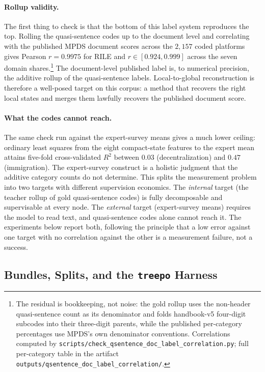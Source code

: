 \paragraph{Rollup validity.} The first thing to check is that the
bottom of this label system reproduces the top. Rolling the
quasi-sentence codes up to the document level and correlating with the
published MPDS document scores across the $2{,}157$ coded platforms
gives Pearson $r = 0.9975$ for RILE and $r \in [0.924, 0.999]$ across
the seven domain shares.\footnote{The residual is bookkeeping, not
noise: the gold rollup uses the non-header quasi-sentence count as its
denominator and folds handbook-v5 four-digit subcodes into their
three-digit parents, while the published per-category percentages use
MPDS's own denominator conventions. Correlations computed by
\texttt{scripts/check\_qsentence\_doc\_label\_correlation.py}; full
per-category table in the artifact
\texttt{outputs/qsentence\_doc\_label\_correlation/}.} The
document-level published label is, to numerical precision, the additive
rollup of the quasi-sentence labels. Local-to-global reconstruction is
therefore a well-posed target on this corpus: a method that recovers
the right local states and merges them lawfully recovers the published
document score.

\paragraph{What the codes cannot reach.} The same check run against
the \citet{BenoitEtAl2025} expert-survey means gives a much lower
ceiling: ordinary least squares from the eight compact-state features
to the expert mean attains five-fold cross-validated $R^2$ between
$0.03$ (decentralization) and $0.47$ (immigration). The expert-survey
construct is a holistic judgment that the additive category counts do
not determine. This splits the measurement problem into two targets
with different supervision economics. The \emph{internal} target (the
teacher rollup of gold quasi-sentence codes) is fully decomposable and
supervisable at every node. The \emph{external} target (expert-survey
means) requires the model to read text, and quasi-sentence codes alone
cannot reach it. The experiments below report both, following the
principle that a low error against one target with no correlation
against the other is a measurement failure, not a success.

\subsection{Bundles, Splits, and the \texttt{treepo} Harness}\label{sec:qsentence-harness}

